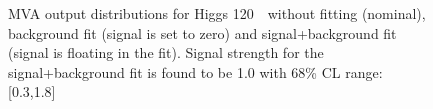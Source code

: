 \begin{figure}[!hbtp]
\caption{
MVA output distributions for Higgs 120~\GeV\ without fitting
(nominal), background fit (signal is set to zero) and
signal+background fit (signal is floating in the fit). Signal strength
for the signal+background fit is found to be 1.0 with 68\% CL range:
[0.3,1.8]}
\label{fig:fit_120}
\end{figure}

